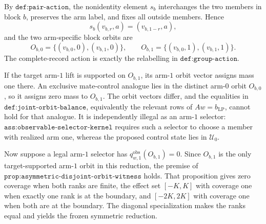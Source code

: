 By \(\texttt{def:pair-action}\), the nonidentity element \(s_b\) interchanges the two members in block \(b\), preserves the arm label, and fixes all outside members. Hence
\[
s_b(v_{b,r},a)=(v_{b,1-r},a),
\]
and the two arm-specific block orbits are
\[
O_{b,0}=\{(v_{b,0},0),(v_{b,1},0)\},
\qquad
O_{b,1}=\{(v_{b,0},1),(v_{b,1},1)\}.
\tag{1}
\]
The complete-record action is exactly the relabelling in \(\texttt{def:group-action}\).

If the target arm-\(1\) lift is supported on \(O_{b,1}\), its arm-\(1\) orbit vector assigns mass one there. An exclusive mate-control analogue lies in the distinct arm-\(0\) orbit \(O_{b,0}\), so it assigns zero mass to \(O_{b,1}\). The orbit vectors differ, and the equalities in \(\texttt{def:joint-orbit-balance}\), equivalently the relevant rows of \(Aw=b_{\mathrm{LP}}\), cannot hold for that analogue. It is independently illegal as an arm-\(1\) selector: \(\texttt{ass:observable-selector-kernel}\) requires such a selector to choose a member with realized arm one, whereas the proposed control state lies in \(\mathcal U_0\).

Now suppose a legal arm-\(1\) selector has \(q^{\mathrm{obs}}_{w,1}(O_{b,1})=0\). Since \(O_{b,1}\) is the only target-supported arm-\(1\) orbit in this reduction, the premise of \(\texttt{prop:asymmetric-disjoint-orbit-witness}\) holds. That proposition gives zero coverage when both ranks are finite, the effect set \([-K,K]\) with coverage one when exactly one rank is at the boundary, and \([-2K,2K]\) with coverage one when both are at the boundary. The diagonal specialization makes the ranks equal and yields the frozen symmetric reduction.